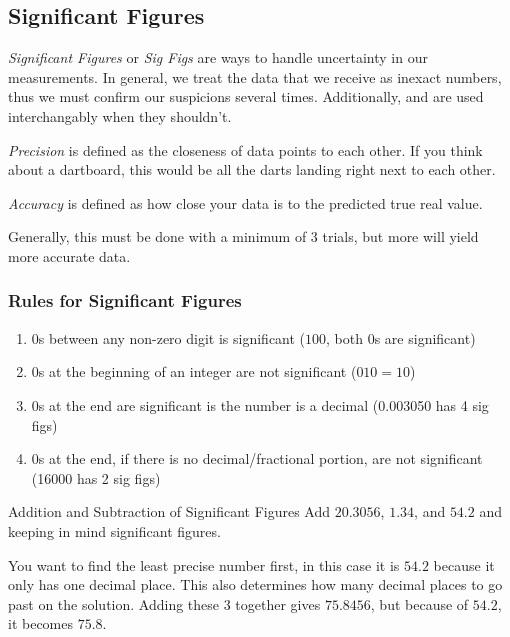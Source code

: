 \subsection{Significant Figures} \label{subsec:Sig Figs}
\begin{definition} \label{def:Sig Figs}
  \emph{Significant Figures} or \emph{Sig Figs} are ways to handle uncertainty in our measurements.
  In general, we treat the data that we receive as inexact numbers, thus we must confirm our suspicions several times.
  Additionally,  and  are used interchangably when they shouldn't.
\end{definition}

\begin{definition}[Precision] \label{def:Precision}
  \emph{Precision} is defined as the closeness of data points to each other.
  If you think about a dartboard, this would be all the darts landing right next to each other.
\end{definition}

\begin{definition}[Accuracy] \label{def:Accuracy}
  \emph{Accuracy} is defined as how close your data is to the predicted true real value.
  \begin{remark}
    Generally, this must be done with a minimum of 3 trials, but more will yield more accurate data.
  \end{remark}
\end{definition}

\subsubsection{Rules for Significant Figures} \label{subsec:Rules for Sig Figs}
\begin{enumerate}
\item 0s between any non-zero digit is significant ($100$, both 0s are significant)
\item 0s at the beginning of an integer are not significant ($010 = 10$)
\item 0s at the end are significant is the number is a decimal (0.003050 has 4 sig figs)
\item 0s at the end, if there is no decimal/fractional portion, are not significant (16000 has 2 sig figs)
\end{enumerate}

\begin{example}[]{Addition and Subtraction of Significant Figures}
  Add $20.3056$, $1.34$, and $54.2$ and keeping in mind significant figures.

  \tcblower

  You want to find the least precise number first, in this case it is $54.2$ because it only has one decimal place.
  This also determines how many decimal places to go past on the solution.
  Adding these 3 together gives $75.8456$, but because of $54.2$, it becomes $75.8$.
\end{example}

